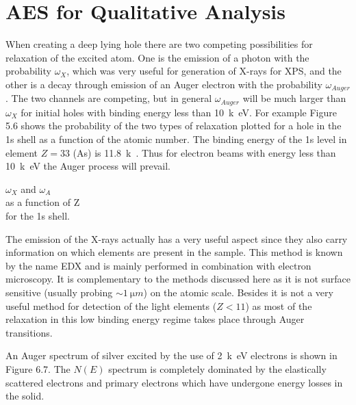 \section{AES for Qualitative Analysis}
When creating a deep lying hole there are two competing possibilities for relaxation of the excited atom. One is the emission of a photon with the probability $\omega_{X}$, which was very useful for generation of X-rays for XPS, and the other is a decay through emission of an Auger electron with the probability $\omega_{Auger}$. The two channels are competing, but in general $\omega_{Auger}$ will be much larger than $\omega_{X}$ for initial holes with binding energy less than \SI{10}{k\electronvolt}. For example Figure 5.6 shows the probability of the two types of  relaxation plotted for a hole in the 1s shell as a function of the atomic number. The binding energy of the 1s level in element $Z=33$ (As) is \SI{11.8}{k\eelectronvolt}. Thus for electron beams with energy less than \SI{10}{k\electronvolt} the Auger process will prevail.\\

          \vspace{1cm}

           $\omega_{X}$ and  $\omega_{A}$\\  as  a
          function of Z\\ for the 1s shell.\\

          \vspace{4cm}

The emission of the X-rays actually has a  very useful aspect since they also carry information on which elements are present in the sample. This method is known by the name EDX and is mainly performed in combination with electron microscopy. It is complementary to the methods discussed here as it is not surface sensitive (usually probing $\sim \SI{1}{\micro m}$) on the atomic scale. Besides it is not a very useful method for detection of the light elements ($Z<11$) as most of the relaxation in this low binding energy regime takes place through Auger transitions.

An Auger spectrum of silver excited by the use of \SI{2}{k\electronvolt} electrons is shown in Figure 6.7. The $N(E)$ spectrum is completely dominated by the elastically scattered electrons and primary electrons which have undergone energy losses in the solid.\\

          \vspace{9.5cm}

